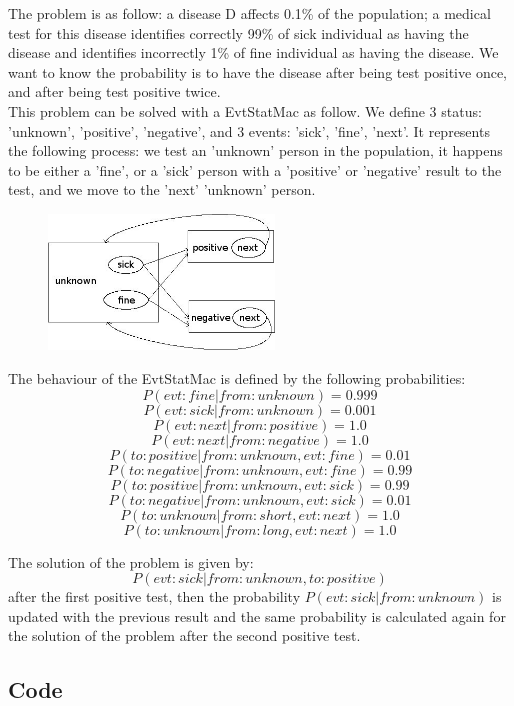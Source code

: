 \documentclass[12pt, a4paper]{article}
\begin{document}
The problem is as follow: a disease D affects 0.1\% of the population; a medical test for this disease identifies correctly 99\% of sick individual as having the disease and identifies incorrectly 1\% of fine individual as having the disease. We want to know the probability is to have the disease after being test positive once, and after being test positive twice.\\

This problem can be solved with a EvtStatMac as follow. We define 3 status: 'unknown', 'positive', 'negative', and 3 events: 'sick', 'fine', 'next'. It represents the following process: we test an 'unknown' person in the population, it happens to be either a 'fine', or a 'sick' person with a 'positive' or 'negative' result to the test, and we move to the 'next' 'unknown' person.\\

\begin{center}
\begin{figure}[H]
\centering
\includegraphics[width=6cm]{./ex2.jpg}
\end{figure}
\end{center}

The behaviour of the EvtStatMac is defined by the following probabilities:\\
$$P(evt:fine|from:unknown)=0.999$$
$$P(evt:sick|from:unknown)=0.001$$
$$P(evt:next|from:positive)=1.0$$
$$P(evt:next|from:negative)=1.0$$
$$P(to:positive|from:unknown,evt:fine)=0.01$$
$$P(to:negative|from:unknown,evt:fine)=0.99$$
$$P(to:positive|from:unknown,evt:sick)=0.99$$
$$P(to:negative|from:unknown,evt:sick)=0.01$$
$$P(to:unknown|from:short,evt:next)=1.0$$
$$P(to:unknown|from:long,evt:next)=1.0$$

The solution of the problem is given by: $$P(evt:sick|from:unknown,to:positive)$$ after the first positive test, then the probability $P(evt:sick|from:unknown)$ is updated with the previous result and the same probability is calculated again for the solution of the problem after the second positive test.\\

\subsection{Code}
\end{document}
